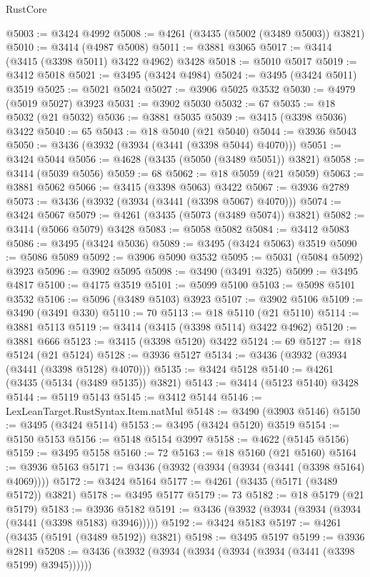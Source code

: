 \begin{lexlean}{RustCore}
\begin{coremodule}
@5003 := @3424 @4992
@5008 := @4261 (@3435 (@5002 (@3489 @5003)) @3821)
@5010 := @3414 (@4987 @5008)
@5011 := @3881 @3065
@5017 := @3414 (@3415 (@3398 @5011) @3422 @4962) @3428
@5018 := @5010 @5017
@5019 := @3412 @5018
@5021 := @3495 (@3424 @4984)
@5024 := @3495 (@3424 @5011) @3519
@5025 := @5021 @5024
@5027 := @3906 @5025 @3532
@5030 := @4979 (@5019 @5027) @3923
@5031 := @3902 @5030
@5032 := 67
@5035 := @18 @5032 (@21 @5032)
@5036 := @3881 @5035
@5039 := @3415 (@3398 @5036) @3422
@5040 := 65
@5043 := @18 @5040 (@21 @5040)
@5044 := @3936 @5043
@5050 := @3436 (@3932 (@3934 (@3441 (@3398 @5044) @4070)))
@5051 := @3424 @5044
@5056 := @4628 (@3435 (@5050 (@3489 @5051)) @3821)
@5058 := @3414 (@5039 @5056)
@5059 := 68
@5062 := @18 @5059 (@21 @5059)
@5063 := @3881 @5062
@5066 := @3415 (@3398 @5063) @3422
@5067 := @3936 @2789
@5073 := @3436 (@3932 (@3934 (@3441 (@3398 @5067) @4070)))
@5074 := @3424 @5067
@5079 := @4261 (@3435 (@5073 (@3489 @5074)) @3821)
@5082 := @3414 (@5066 @5079) @3428
@5083 := @5058 @5082
@5084 := @3412 @5083
@5086 := @3495 (@3424 @5036)
@5089 := @3495 (@3424 @5063) @3519
@5090 := @5086 @5089
@5092 := @3906 @5090 @3532
@5095 := @5031 (@5084 @5092) @3923
@5096 := @3902 @5095
@5098 := @3490 (@3491 @325)
@5099 := @3495 @4817
@5100 := @4175 @3519
@5101 := @5099 @5100
@5103 := @5098 @5101 @3532
@5106 := @5096 (@3489 @5103) @3923
@5107 := @3902 @5106
@5109 := @3490 (@3491 @330)
@5110 := 70
@5113 := @18 @5110 (@21 @5110)
@5114 := @3881 @5113
@5119 := @3414 (@3415 (@3398 @5114) @3422 @4962)
@5120 := @3881 @666
@5123 := @3415 (@3398 @5120) @3422
@5124 := 69
@5127 := @18 @5124 (@21 @5124)
@5128 := @3936 @5127
@5134 := @3436 (@3932 (@3934 (@3441 (@3398 @5128) @4070)))
@5135 := @3424 @5128
@5140 := @4261 (@3435 (@5134 (@3489 @5135)) @3821)
@5143 := @3414 (@5123 @5140) @3428
@5144 := @5119 @5143
@5145 := @3412 @5144
@5146 := LexLeanTarget.RustSyntax.Item.natMul
@5148 := @3490 (@3903 @5146)
@5150 := @3495 (@3424 @5114)
@5153 := @3495 (@3424 @5120) @3519
@5154 := @5150 @5153
@5156 := @5148 @5154 @3997
@5158 := @4622 (@5145 @5156)
@5159 := @3495 @5158
@5160 := 72
@5163 := @18 @5160 (@21 @5160)
@5164 := @3936 @5163
@5171 := @3436 (@3932 (@3934 (@3934 (@3441 (@3398 @5164) @4069))))
@5172 := @3424 @5164
@5177 := @4261 (@3435 (@5171 (@3489 @5172)) @3821)
@5178 := @3495 @5177
@5179 := 73
@5182 := @18 @5179 (@21 @5179)
@5183 := @3936 @5182
@5191 := @3436 (@3932 (@3934 (@3934 (@3934 (@3441 (@3398 @5183) @3946)))))
@5192 := @3424 @5183
@5197 := @4261 (@3435 (@5191 (@3489 @5192)) @3821)
@5198 := @3495 @5197
@5199 := @3936 @2811
@5208 := @3436 (@3932 (@3934 (@3934 (@3934 (@3934 (@3441 (@3398 @5199) @3945))))))

\end{coremodule}
\end{lexlean}
